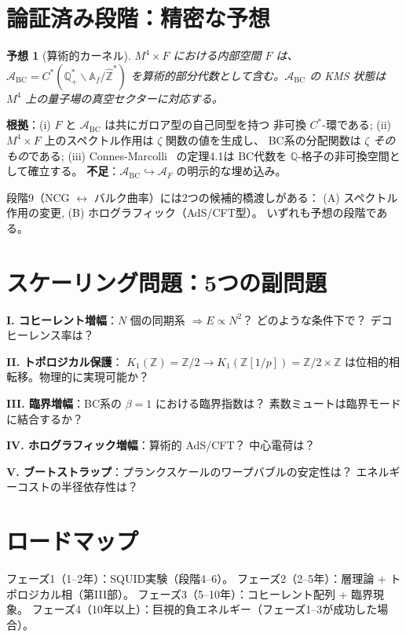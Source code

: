 \documentclass[11pt,a4paper]{article}
\newtheorem{conjecture}[theorem]{予想}
\newcommand{\Zp}{\mathbb{Z}[1/p]}
\newcommand{\Zhat}{\hat{\mathbb{Z}}}
\begin{document}
\section{論証済み段階：精密な予想}

\begin{conjecture}[算術的カーネル]
\label{conj:kernel}
$M^4 \times F$ における内部空間 $F$ は、
$\mathcal{A}_{\mathrm{BC}} = C^*(\mathbb{Q}_+^* \backslash \mathbb{A}_f / \Zhat^*)$
を算術的部分代数として含む。$\mathcal{A}_{\mathrm{BC}}$ の KMS 状態は
$M^4$ 上の量子場の真空セクターに対応する。
\end{conjecture}

\textbf{根拠}：(i) $F$ と $\mathcal{A}_{\mathrm{BC}}$ は共にガロア型の自己同型を持つ
非可換 $C^*$-環である;
(ii) $M^4\times F$ 上のスペクトル作用は $\zeta$ 関数の値を生成し、
BC系の分配関数は $\zeta$ \emph{そのもの}である;
(iii) Connes-Marcolli~\cite{ConnesMarcolli2006} の定理4.1は
BC代数を $\mathbb{Q}$-格子の非可換空間として確立する。
\textbf{不足}：$\mathcal{A}_{\mathrm{BC}} \hookrightarrow \mathcal{A}_F$
の明示的な埋め込み。

段階9（NCG $\leftrightarrow$ バルク曲率）には2つの候補的橋渡しがある：
(A) スペクトル作用の変更, (B) ホログラフィック（AdS/CFT型）。
いずれも予想の段階である。

\section{スケーリング問題：5つの副問題}

\textbf{I. コヒーレント増幅}：$N$ 個の同期系 $\Rightarrow E \propto N^2$？
どのような条件下で？ デコヒーレンス率は？

\textbf{II. トポロジカル保護}：
$K_1(\mathbb{Z}) = \mathbb{Z}/2 \to K_1(\Zp) = \mathbb{Z}/2 \times \mathbb{Z}$
は位相的相転移。物理的に実現可能か？

\textbf{III. 臨界増幅}：BC系の $\beta = 1$ における臨界指数は？
素数ミュートは臨界モードに結合するか？

\textbf{IV. ホログラフィック増幅}：算術的 AdS/CFT？ 中心電荷は？

\textbf{V. ブートストラップ}：プランクスケールのワープバブルの安定性は？
エネルギーコストの半径依存性は？

\section{ロードマップ}

フェーズ1（1--2年）：SQUID実験（段階4--6）。
フェーズ2（2--5年）：層理論 + トポロジカル相（第III部）。
フェーズ3（5--10年）：コヒーレント配列 + 臨界現象。
フェーズ4（10年以上）：巨視的負エネルギー（フェーズ1--3が成功した場合）。
\end{document}
